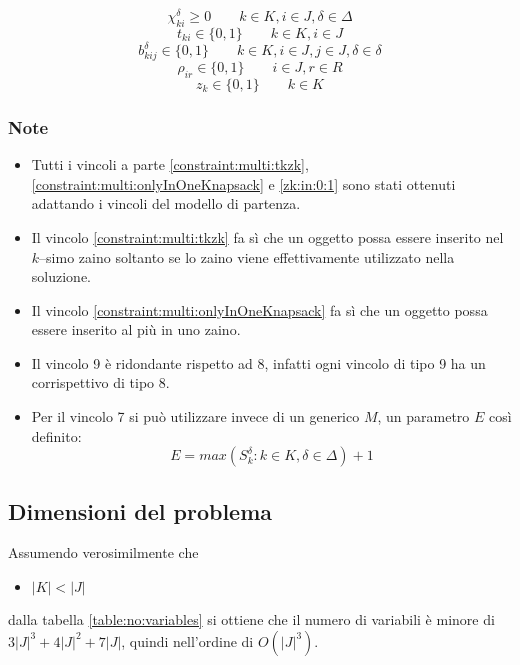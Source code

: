 \documentclass{scrartcl}
\begin{document}
\begin{equation}
\chi_{ki}^\delta \geq 0 \quad \quad k \in K, i \in J, \delta \in \Delta
\end{equation}
\begin{equation}
t_{ki} \in \{0,1\} \quad \quad k \in K, i \in J
\end{equation}
\begin{equation}
b_{kij}^\delta \in \{0,1\} \quad \quad k \in K, i \in J, j \in J, \delta \in \delta
\end{equation}
\begin{equation}
\rho_{ir} \in \{0,1\} \quad\quad i \in J, r \in R
\end{equation}
\begin{equation}
\label{zk:in:0:1}
z_k \in \{0,1\} \quad \quad k \in K
\end{equation}

\subsubsection{Note}
\begin{itemize}
\item Tutti i vincoli a parte \ref{constraint:multi:tkzk}, \ref{constraint:multi:onlyInOneKnapsack} e \ref{zk:in:0:1} sono stati ottenuti adattando i vincoli del modello di partenza.
\item Il vincolo \ref{constraint:multi:tkzk} fa sì che un oggetto possa essere inserito nel $k$--simo zaino soltanto se lo zaino viene effettivamente utilizzato nella soluzione.
\item Il vincolo \ref{constraint:multi:onlyInOneKnapsack} fa sì che un oggetto possa essere inserito al più in uno zaino. 
\item Il vincolo 9 è ridondante rispetto ad 8, infatti ogni vincolo di tipo 9 ha un corrispettivo di tipo 8.
\item Per il vincolo 7 si può utilizzare invece di un generico $M$, un parametro $E$ così definito:
$$
E = max(S_k^\delta : k \in K, \delta \in \Delta) + 1
$$ 
\end{itemize}

\subsection{Dimensioni del problema}
\label{sec:orig:dimensioneDelProblema}
Assumendo verosimilmente che 
\begin{itemize}
	\item $|K| < |J|$
\end{itemize}  
dalla tabella \ref{table:no:variables}
si ottiene che il numero di variabili è minore di $3|J|^3 + 4|J|^2 + 7|J|$, quindi
nell'ordine di $O(|J|^3)$.
\end{document}
